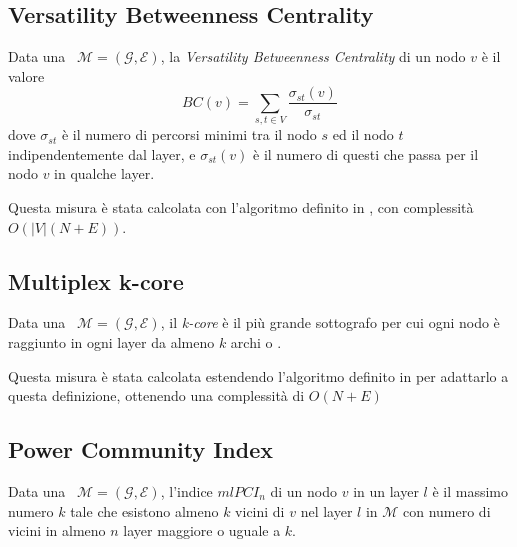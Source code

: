 \subsection{Versatility Betweenness Centrality}

\begin{definizione}
    Data una \muln\ $\mathcal{M}=(\mathcal{G}, \mathcal{E})$, la 
    \textit{Versatility Betweenness Centrality} di un nodo $v$ è il valore 
    \begin{equation}
        BC(v) = \sum_{s, t \in V} \frac{\sigma_{st}(v)}{\sigma_{st}}
    \end{equation}
    dove $\sigma_{st}$ è il numero di percorsi minimi tra il nodo $s$ ed il nodo $t$
    indipendentemente dal layer, e $\sigma_{st}(v)$ è il numero di questi che passa 
    per il nodo $v$ in qualche layer.
\end{definizione}

Questa misura è stata calcolata con l'algoritmo definito in \cite{dedomenico:verbetw}, 
con complessità $O\left(|V|\left(N+E\right)\right)$.

\subsection{Multiplex k-core}

\begin{definizione}
    Data una \muln\ $\mathcal{M}=(\mathcal{G}, \mathcal{E})$, il \textit{k-core} è
    il più grande sottografo per cui ogni nodo è raggiunto in ogni layer da almeno $k$ archi o
    \interc.
\end{definizione}

Questa misura è stata calcolata estendendo l'algoritmo definito in \cite{batagelj:kcore} per 
adattarlo a questa definizione, ottenendo una complessità di $O(N + E)$  

\subsection{Power Community Index}
\begin{definizione}
    Data una \muln\ $\mathcal{M}=(\mathcal{G}, \mathcal{E})$, 
    l'indice $mlPCI_n$ di un nodo $v$ in un layer $l$ 
    è il massimo numero $k$ tale che esistono almeno $k$ vicini di $v$ nel layer $l$ in $\mathcal{M}$
    con numero di vicini in almeno $n$ layer maggiore o uguale a $k$.
\end{definizione}

